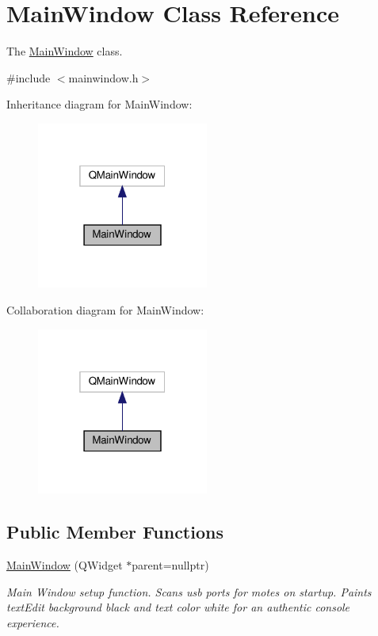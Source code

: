 \hypertarget{classMainWindow}{}\section{Main\+Window Class Reference}
\label{classMainWindow}


The \hyperlink{classMainWindow}{Main\+Window} class.  




{\ttfamily \#include $<$mainwindow.\+h$>$}



Inheritance diagram for Main\+Window\+:
\nopagebreak
\begin{figure}[H]
\begin{center}
\leavevmode
\includegraphics[width=160pt]{classMainWindow__inherit__graph}
\end{center}
\end{figure}


Collaboration diagram for Main\+Window\+:
\nopagebreak
\begin{figure}[H]
\begin{center}
\leavevmode
\includegraphics[width=160pt]{classMainWindow__coll__graph}
\end{center}
\end{figure}
\subsection*{Public Member Functions}
\begin{DoxyCompactItemize}
\item 
\mbox{\label{classMainWindow_a996c5a2b6f77944776856f08ec30858d}} 
\hyperlink{classMainWindow_a996c5a2b6f77944776856f08ec30858d}{Main\+Window} (Q\+Widget $\ast$parent=nullptr)
\begin{DoxyCompactList}\small\item\em Main Window setup function. Scans usb ports for motes on startup. Paints text\+Edit background black and text color white for an authentic console experience. \end{DoxyCompactList}\end{DoxyCompactItemize}
